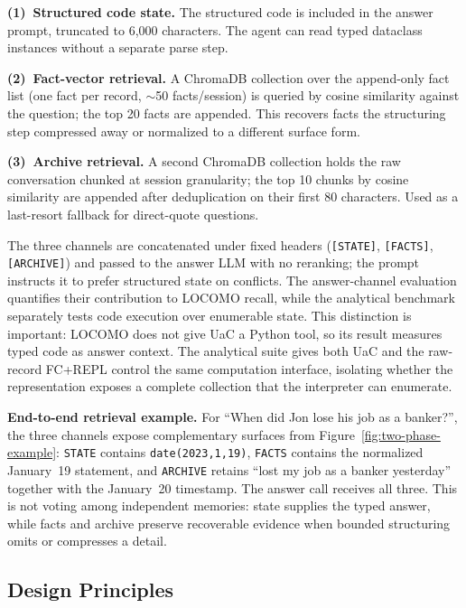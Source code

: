 \textbf{(1)~Structured code state.} The structured code is included in the answer prompt, truncated to 6{,}000 characters. The agent can read typed dataclass instances without a separate parse step.

\textbf{(2)~Fact-vector retrieval.} A ChromaDB collection over the append-only fact list (one fact per record, $\sim$50 facts/session) is queried by cosine similarity against the question; the top 20 facts are appended. This recovers facts the structuring step compressed away or normalized to a different surface form.

\textbf{(3)~Archive retrieval.} A second ChromaDB collection holds the raw conversation chunked at session granularity; the top 10 chunks by cosine similarity are appended after deduplication on their first 80 characters. Used as a last-resort fallback for direct-quote questions.

The three channels are concatenated under fixed headers (\texttt{[STATE]}, \texttt{[FACTS]}, \texttt{[ARCHIVE]}) and passed to the answer LLM with no reranking; the prompt instructs it to prefer structured state on conflicts. The answer-channel evaluation quantifies their contribution to LOCOMO recall, while the analytical benchmark separately tests code execution over enumerable state. This distinction is important: LOCOMO does not give UaC a Python tool, so its result measures typed code as answer context. The analytical suite gives both UaC and the raw-record FC+REPL control the same computation interface, isolating whether the representation exposes a complete collection that the interpreter can enumerate.

\textbf{End-to-end retrieval example.} For ``When did Jon lose his job as a banker?'', the three channels expose complementary surfaces from Figure~\ref{fig:two-phase-example}: \texttt{STATE} contains \texttt{date(2023,1,19)}, \texttt{FACTS} contains the normalized January~19 statement, and \texttt{ARCHIVE} retains ``lost my job as a banker yesterday'' together with the January~20 timestamp. The answer call receives all three. This is not voting among independent memories: state supplies the typed answer, while facts and archive preserve recoverable evidence when bounded structuring omits or compresses a detail.

\subsection{Design Principles}
\label{sec:principles}

